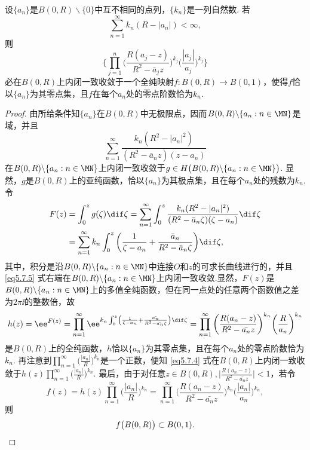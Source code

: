 \begin{theorem}\label{thm5.7.4}
设$\{a_n\}$是$B(0,R)\backslash\{0\}$中互不相同的点列，$\{k_n\}$是一列自然数. 若
\[\sum_{n=1}^\infty k_n(R-|a_n|)<\infty,\]
则
\begin{equation}\label{eq5.7.4}
\bigg\{\prod_{j=1}^n\bigg(\frac{R(a_j-z)}{R^2-\bar a_jz}\bigg)^{k_j}
\bigg(\frac{|a_j|}{a_j}\bigg)^{k_j}\bigg\}
\end{equation}
必在$B(0,R)$上内闭一致收敛于一个全纯映射$f:B(0,R)\to B(0,1)$，使得$f$恰以$\{a_n\}$为其零点集，且$f$在每个$a_n$处的零点阶数恰为$k_n$.
\end{theorem}
\begin{proof}
由所给条件知$\{a_n\}$在$B(0,R)$中无极限点，因而$B(0,R)\backslash\{a_n:n\in\MN\}$是域，并且
\[\sum_{n=1}^\infty\frac{k_n(R^2-|a_n|^2)}{(R^2-\bar a_nz)(z-a_n)}\]
在$B(0,R)\backslash\{a_n:n\in\MN\}$上内闭一致收敛于$g\in H\big(B(0,R)\backslash
\{a_n:n\in\MN\}\big)$. 显然，$g$是$B(0,R)$上的亚纯函数，恰以$\{a_n\}$为其极点集，且在每个$a_n$处的残数为$k_n$. 令
\begin{equation}\label{eq5.7.5}
\begin{aligned}
F(z)&=\int_0^zg(\zeta)\dif \zeta=\sum_{n=1}^\infty\int_0^z
\frac{k_n(R^2-|a_n|^2)}{(R^2-\bar a_n\zeta)(\zeta-a_n)}\dif \zeta\\
&=\sum_{n=1}^\infty k_n\int_0^z\bigg(\frac1{\zeta-a_n}+\frac{\bar a_n}{R^2
-\bar a_n\zeta}\bigg)\dif \zeta,
\end{aligned}
\end{equation}
其中，积分是沿$B(0,R)\backslash\{a_n:n\in\MN\}$中连接$O$和$z$的可求长曲线进行的，并且 \eqref{eq5.7.5} 式右端在$B(0,R)\backslash\{a_n:n\in\MN\}$上内闭一致收敛.显然，$F(z)$是$B(0,R)\backslash\{a_n:n\in\MN\}$上的多值全纯函数，但在同一点处的任意两个函数值之差为$2\pi\ii$的整数倍，故
\[h(z)=\ee^{F(z)}=\prod_{n=1}^\infty\ee^{k_n\int_0^z\left(\frac1{\zeta-a_n}
+\frac{\bar {a_n}}{R^2-\bar {a_n}\zeta}\right)\dif \zeta}
=\prod_{n=1}^\infty\bigg(\frac{R(a_n-z)}{R^2-\bar {a_n}z}\bigg)^{k_n}
\bigg(\frac{R}{a_n}\bigg)^{k_n}\]
是$B(0,R)$上的全纯函数，$h$恰以$\{a_n\}$为其零点集，且在每个$a_n$处的零点阶数恰为$k_n$. 再注意到$\prod_{n=1}^\infty\bigg(\frac{|a_n|}{R}\bigg)^{k_n}$是一个正数，便知 \eqref{eq5.7.4} 式在$B(0,R)$上内闭一致收敛于$h(z)\prod_{n=1}^\infty\bigg(\frac{|a_n|}{R}\bigg)^{k_n}$. 最后，由于对任意$z\in B(0,R),\bigg|\frac{R(a_n-z)}{R^2-\bar {a_n}z}\bigg|<1$，若令
\[f(z)=h(z)\prod_{n=1}^\infty\bigg(\frac{|a_n|}{R}\bigg)^{k_n}
=\prod_{n=1}^\infty\bigg(\frac{R(a_n-z)}{R^2-\bar {a_n}z}\bigg)^{k_n}
\bigg(\frac{|a_n|}{a_n}\bigg)^{k_n},\]
则
\begin{equation*}
  f\big(B(0,R)\big)\subset B(0,1). \qedhere
\end{equation*}
\end{proof}

